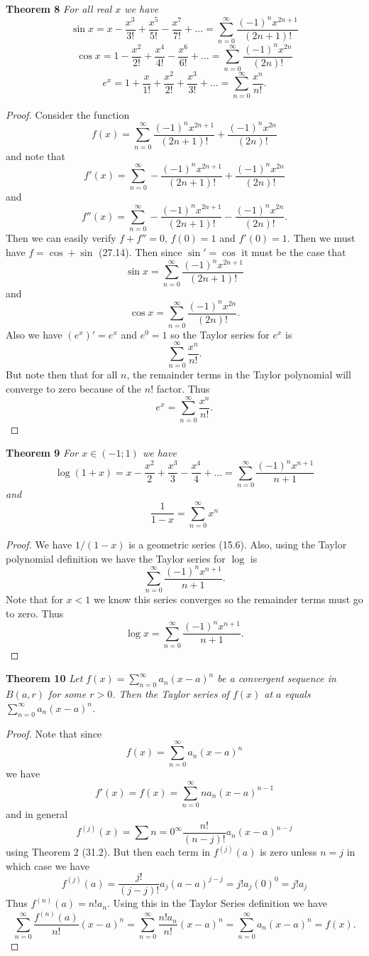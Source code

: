 \documentclass{article}
\begin{document}
\begin{flushleft}
\textbf{Theorem 8}
\textsl{For all real $x$ we have
\[
\sin x = x - \frac{x^3}{3!} + \frac{x^5}{5!} - \frac{x^7}{7!} + \dots = \sum_{n=0}^{\infty} \frac{(-1)^{n} x^{2n+1}}{(2n+1)!}
\]
\[
\cos x = 1 - \frac{x^2}{2!} + \frac{x^4}{4!} - \frac{x^6}{6!} + \dots = \sum_{n=0}^{\infty} \frac{(-1)^{n} x^{2n}}{(2n)!}
\]
\[
e^x = 1 + \frac{x}{1!} + \frac{x^2}{2!} + \frac{x^3}{3!} + \dots = \sum_{n=0}^{\infty} \frac{x^n}{n!}.
\]}
\begin{proof}
Consider the function
\[
f(x) = \sum_{n=0}^{\infty} \frac{(-1)^{n} x^{2n+1}}{(2n+1)!} + \frac{(-1)^{n} x^{2n}}{(2n)!}
\]
and note that
\[
f'(x) = \sum_{n=0}^{\infty} -\frac{(-1)^{n} x^{2n+1}}{(2n+1)!} + \frac{(-1)^{n} x^{2n}}{(2n)!}
\]
and
\[
f''(x) = \sum_{n=0}^{\infty} -\frac{(-1)^{n} x^{2n+1}}{(2n+1)!} - \frac{(-1)^{n} x^{2n}}{(2n)!}.
\]
Then we can easily verify $f+f'' = 0$, $f(0) = 1$ and $f'(0) = 1$. Then we must have $f = \cos + \sin$ (27.14). Then since $\sin' = \cos$ it must be the case that
\[
\sin x = \sum_{n=0}^{\infty} \frac{(-1)^{n} x^{2n+1}}{(2n+1)!}
\]
and
\[
\cos x = \sum_{n=0}^{\infty} \frac{(-1)^{n} x^{2n}}{(2n)!}.
\]
Also we have $(e^x)' = e^x$ and $e^0 = 1$ so the Taylor series for $e^x$ is
\[
\sum_{n=0}^{\infty} \frac{x^n}{n!}.
\]
But note then that for all $n$, the remainder terms in the Taylor polynomial will converge to zero because of the $n!$ factor. Thus
\[
e^x = \sum_{n=0}^{\infty} \frac{x^n}{n!}.
\]
\end{proof}

\textbf{Theorem 9}
\textsl{For $x \in (-1;1)$ we have
\[
\log (1+x) = x - \frac{x^2}{2} + \frac{x^3}{3} - \frac{x^4}{4} + \dots = \sum_{n=0}^{\infty} \frac{(-1)^{n} x^{n+1}}{n+1}
\]
and
\[
\frac{1}{1-x} = \sum_{n=0}^{\infty} x^n
\]}
\begin{proof}
We have $1/(1-x)$ is a geometric series (15.6). Also, using the Taylor polynomial definition we have the Taylor series for $\log$ is
\[
\sum_{n=0}^{\infty} \frac{(-1)^{n} x^{n+1}}{n+1}.
\]
Note that for $x < 1$ we know this series converges so the remainder terms must go to zero. Thus
\[
\log x = \sum_{n=0}^{\infty} \frac{(-1)^{n} x^{n+1}}{n+1}.
\]
\end{proof}

\textbf{Theorem 10}
\textsl{Let $f(x) = \sum_{n=0}^{\infty} a_n (x-a)^n$ be a convergent sequence in $B(a,r)$ for some $r>0$. Then the Taylor series of $f(x)$ at $a$ equals $\sum_{n=0}^{\infty} a_n (x-a)^n$.}
\begin{proof}
Note that since
\[
f(x) = \sum_{n=0}^{\infty} a_n (x-a)^n
\]
we have
\[
f'(x) = f(x) = \sum_{n=0}^{\infty} n a_n (x-a)^{n-1}
\]
and in general
\[
f^{(j)}(x) = \sum{n=0}^{\infty} \frac{n!}{(n-j)!} a_n (x-a)^{n-j}
\]
using Theorem 2 (31.2). But then each term in $f^{(j)} (a)$ is zero unless $n=j$ in which case we have
\[
f^{(j)}(a) = \frac{j!}{(j-j)!} a_j (a-a)^{j-j} = j! a_j (0)^{0} = j! a_j
\]
Thus $f^{(n)} (a) = n! a_n$. Using this in the Taylor Series definition we have
\[
\sum_{n=0}^{\infty} \frac{f^{(n)} (a)}{n!} (x-a)^n = \sum_{n=0}^{\infty} \frac{n! a_n}{n!} (x-a)^n = \sum_{n=0}^{\infty} a_n (x-a)^n = f(x).
\]
\end{proof}

\end{flushleft}
\end{document}
